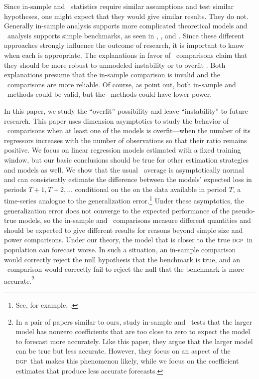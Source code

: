 \documentclass[11pt]{article}
\newcommand{\dgp}{\textsc{dgp}}
\begin{document}
Since in-sample and \oos\ statistics require similar assumptions and
test similar hypotheses, one might expect that they would give similar
results.  They do not.  Generally in-sample analysis supports more
complicated theoretical models and \oos\ analysis supports simple
benchmarks, as seen in \citet{meese_empirical_1983},
\citet{stock_forecasting_2003}, and \citet{goyal-welch-2008-rfs}.
Since these different approaches strongly influence the outcome of
research, it is important to know when each is appropriate.  The
explanations in favor of \oos\ comparisons claim that they should be
more robust to unmodeled instability
\citep{clark_power_2005,giacomini_tests_2006,giacomini-rossi-2009-REStud,giacomini-rossi-2010-JAppliedEconometrics}
or to overfit \citep{mccracken_data_1998,clark_can_2004}.  Both
explanations presume that the in-sample comparison is invalid and the
\oos\ comparisons are more reliable.  Of course, as
\citet{inoue_kilian_2004,inoue_selection_2006} point out, both
in-sample and \oos\ methods could be valid, but the \oos\ methods
could have lower power.

In this paper, we study the ``overfit'' possibility and leave
``instability'' to future research. This paper uses dimension
asymptotics to study the behavior of \oos\ comparisons when at least
one of the models is overfit---when the number of its regressors
increases with the number of observations so that their ratio remains
positive.  We focus on linear regression models estimated with a fixed
training window, but our basic conclusions should be true for other
estimation strategies and models as well.  We show that the usual
\oos\ average is asymptotically normal and can consistently estimate
the difference between the models' expected loss in periods
$T+1,T+2,\dots$ conditional on the on the data available in period
$T$, a time-series analogue to the generalization error.\footnote{See,
  for example, \citet{elemstatlearning}.}  Under these asymptotics,
the generalization error does not converge to the expected performance
of the pseudo-true models, so the in-sample and \oos\
comparisons measure different quantities and should be expected to
give different results for reasons beyond simple size and power
comparisons.  Under our theory, the model that is closer to the true
\dgp\ in population can forecast worse.  In such a situation, an
in-sample comparison would correctly reject the null hypothesis that
the benchmark is true, and an \oos\ comparison would correctly fail to
reject the null that the benchmark is more accurate.\footnote{In a
  pair of papers similar to ours,
  \citet{RePEc:fip:fedkrw:rwp09-10,RePEc:fip:fedkrw:rwp09-11} study
  in-sample and \oos\ tests that the larger model has nonzero
  coefficients that are too close to zero to expect the model to
  forecast more accurately.  Like this paper, they argue that the
  larger model can be true but less accurate.  However, they focus on
  an aspect of the \dgp\ that makes this phenomenon likely, while we
  focus on the coefficient estimates that produce less accurate
  forecasts.}
\end{document}
